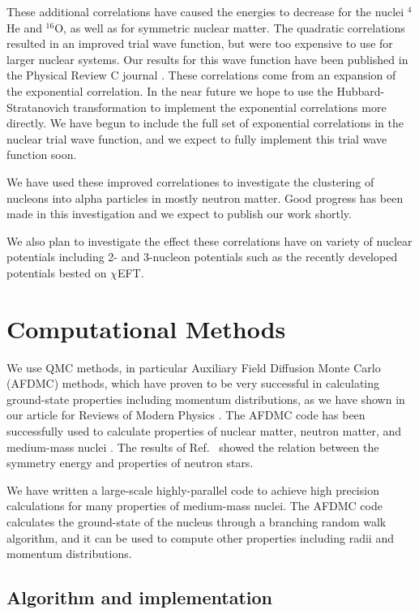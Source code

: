 \documentclass[12pt,letterpaper]{article}
\begin{document}
These additional correlations have caused the energies to decrease for the nuclei $^4$He and $^{16}$O, as well as for symmetric nuclear matter. The quadratic correlations resulted in an improved trial wave function, but were too expensive to use for larger nuclear systems. Our results for this wave function have been published in the Physical Review C journal \cite{lon18}. These correlations come from an expansion of the exponential correlation. In the near future we hope to use the Hubbard-Stratanovich transformation to implement the exponential correlations more directly. We have begun to include the full set of exponential correlations in the nuclear trial wave function, and we expect to fully implement this trial wave function soon.

We have used these improved correlationes to investigate the clustering of nucleons into alpha particles in mostly neutron matter. Good progress has been made in this investigation and we expect to publish our work shortly.

We also plan to investigate the effect these correlations have on variety of nuclear potentials including 2- and 3-nucleon potentials such as the recently developed potentials bested on $\chi$EFT.

\section{Computational Methods}
\label{sec:comp_met}

We use QMC methods, in particular Auxiliary Field Diffusion Monte Carlo 
(AFDMC) methods, which have proven to be very successful in calculating 
ground-state properties including momentum distributions, as we have shown 
in our article for Reviews of Modern Physics \cite{car15}. The AFDMC code 
has been successfully used to calculate properties of nuclear matter, 
neutron matter, and medium-mass nuclei \cite{gan14}. The results of 
Ref.~\cite{gan12} showed the relation between the symmetry energy and 
properties 
of neutron stars.

We have written a large-scale highly-parallel code to achieve high precision 
calculations for many properties of medium-mass nuclei. The AFDMC code 
calculates the
ground-state of the nucleus through a branching random walk algorithm, and it
can be used to compute other properties including radii and momentum 
distributions.

\subsection{Algorithm and implementation}
\end{document}
